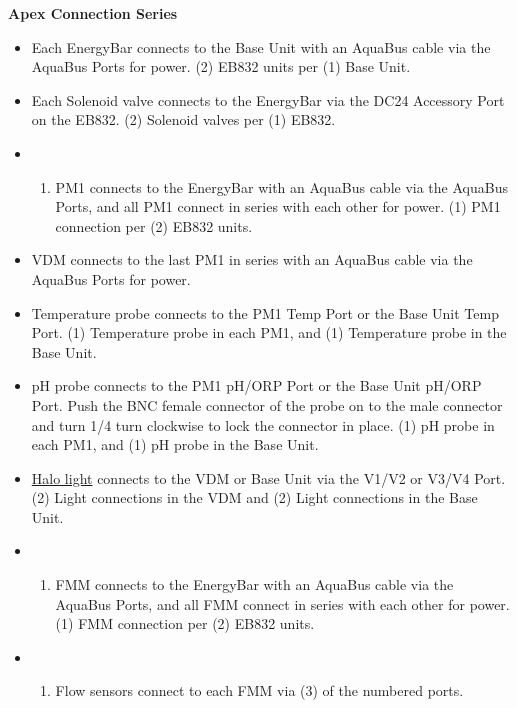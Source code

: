 \documentclass[]{book}
\providecommand{\tightlist}{%
  \setlength{\itemsep}{0pt}\setlength{\parskip}{0pt}}
\begin{document}
 \textbf{Apex Connection Series}

\begin{itemize}
\item
  Each EnergyBar connects to the Base Unit with an AquaBus cable via the
  AquaBus Ports for power. (2) EB832 units per (1) Base Unit.\\
\item
  Each Solenoid valve connects to the EnergyBar via the DC24 Accessory
  Port on the EB832. (2) Solenoid valves per (1) EB832.\\
\item
  \begin{enumerate}
  \def\labelenumi{(\arabic{enumi})}
  \tightlist
  \item
    PM1 connects to the EnergyBar with an AquaBus cable via the AquaBus
    Ports, and all PM1 connect in series with each other for power. (1)
    PM1 connection per (2) EB832 units.\\
  \end{enumerate}
\item
  VDM connects to the last PM1 in series with an AquaBus cable via the
  AquaBus Ports for power.\\
\item
  Temperature probe connects to the PM1 Temp Port or the Base Unit Temp
  Port. (1) Temperature probe in each PM1, and (1) Temperature probe in
  the Base Unit.\\
\item
  pH probe connects to the PM1 pH/ORP Port or the Base Unit pH/ORP Port.
  Push the BNC female connector of the probe on to the male connector
  and turn 1/4 turn clockwise to lock the connector in place. (1) pH
  probe in each PM1, and (1) pH probe in the Base Unit.\\
\item
  \href{Manuals/HALO_Quick_Start_Guide.pdf}{Halo light} connects to the
  VDM or Base Unit via the V1/V2 or V3/V4 Port. (2) Light connections in
  the VDM and (2) Light connections in the Base Unit.\\
\item
  \begin{enumerate}
  \def\labelenumi{(\arabic{enumi})}
  \tightlist
  \item
    FMM connects to the EnergyBar with an AquaBus cable via the AquaBus
    Ports, and all FMM connect in series with each other for power. (1)
    FMM connection per (2) EB832 units.\\
  \end{enumerate}
\item
  \begin{enumerate}
  \def\labelenumi{(\arabic{enumi})}
  \setcounter{enumi}{2}
  \tightlist
  \item
    Flow sensors connect to each FMM via (3) of the numbered ports.
  \end{enumerate}
\end{itemize}
\end{document}
